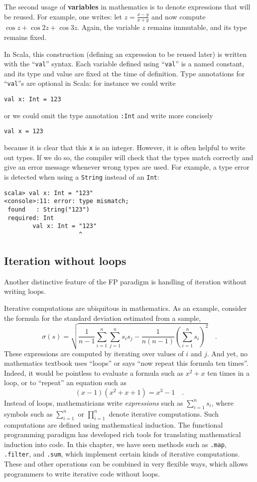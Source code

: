 The second usage of \textbf{variables} in mathematics
is to denote expressions that will be reused. For example, one writes:
let $z=\frac{x-y}{x+y}$ and now compute $\cos z+\cos2z+\cos3z$.
Again, the variable $z$ remains immutable, and its type remains fixed.

In Scala, this construction (defining an expression to be reused later)
is written with the ``\lstinline!val!'' syntax. Each variable defined
using ``\lstinline!val!'' is a named constant, and its type and
value are fixed at the time of definition. Type annotations for ``\lstinline!val!''s
are optional in Scala: for instance we could write 
\begin{lstlisting}
val x: Int = 123
\end{lstlisting}
or we could omit the type annotation \lstinline!:Int! and write more
concisely
\begin{lstlisting}
val x = 123
\end{lstlisting}
because it is clear that this \texttt{}\lstinline!x! is an integer.
However, it is often helpful to write out types. If we do so, the
compiler will check that the types match correctly and give an error
message whenever wrong types are used. For example, a type error is
detected when using a \lstinline!String! instead of an \lstinline!Int!:
\begin{lstlisting}
scala> val x: Int = "123"
<console>:11: error: type mismatch;
 found   : String("123")
 required: Int
        val x: Int = "123"
                     ^
\end{lstlisting}


\subsection{Iteration without loops}

Another distinctive feature of the FP paradigm is handling of iteration
without writing loops.

Iterative computations are ubiquitous in mathematics. As an example,
consider the formula for the standard deviation estimated from a sample,
\[
\sigma(s)=\sqrt{\frac{1}{n-1}\sum_{i=1}^{n}\sum_{j=1}^{n}s_{i}s_{j}-\frac{1}{n\left(n-1\right)}\left(\sum_{i=1}^{n}s_{i}\right)^{2}}\quad.
\]
These expressions are computed by iterating over values of $i$ and
$j$. And yet, no mathematics textbook uses ``loops'' or says ``now
repeat this formula ten times''. Indeed, it would be pointless to
evaluate a formula such as $x^{2}+x$ ten times in a loop, or to ``repeat''
an equation such as
\[
\left(x-1\right)(x^{2}+x+1)=x^{3}-1\quad.
\]
Instead of loops, mathematicians write \emph{expressions} such as
$\sum_{i=1}^{n}s_{i}$, where symbols such as $\sum_{i=1}^{n}$ or
$\prod_{i=1}^{n}$ denote iterative computations. Such computations
are defined using mathematical induction.
The functional programming paradigm has developed rich tools for translating
mathematical induction into code. In this chapter, we have seen methods
such as \lstinline!.map!, \lstinline!.filter!, and \lstinline!.sum!,
which implement certain kinds of iterative computations. These and
other operations can be combined in very flexible ways, which allows
programmers to write iterative code without loops.

